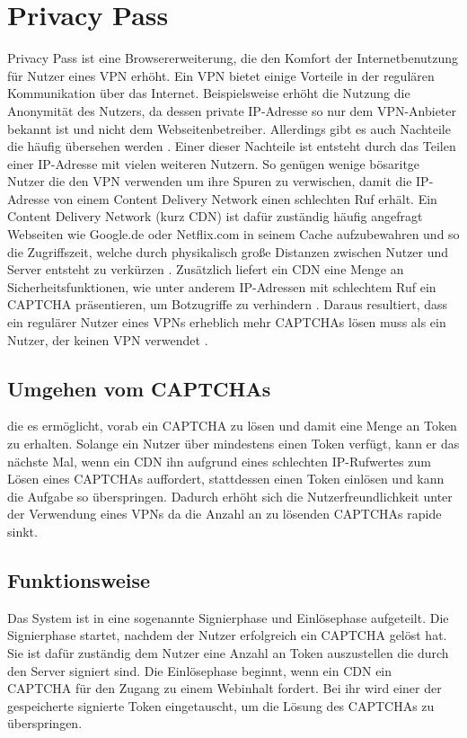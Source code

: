 \documentclass{scrreprt}
\begin{document}
\section{Privacy Pass}
\label{sec:privacy-pass}
Privacy Pass ist eine Browsererweiterung, die den Komfort der Internetbenutzung für Nutzer eines VPN erhöht. Ein VPN bietet einige Vorteile in der regulären Kommunikation über das Internet. Beispielsweise erhöht die Nutzung die Anonymität des Nutzers, da dessen private IP-Adresse so nur dem VPN-Anbieter bekannt ist und nicht dem Webseitenbetreiber. Allerdings gibt es auch Nachteile die häufig übersehen werden \cite{pp-Abbas2023Security}. Einer dieser Nachteile ist entsteht durch das Teilen einer IP-Adresse mit vielen weiteren Nutzern. So genügen wenige bösaritge Nutzer die den VPN verwenden um ihre Spuren zu verwischen, damit die IP-Adresse von einem Content Delivery Network einen schlechten Ruf erhält. Ein Content Delivery Network (kurz CDN) ist dafür zuständig häufig angefragt Webseiten wie Google.de oder Netflix.com in seinem Cache aufzubewahren und so die Zugriffszeit, welche durch physikalisch große Distanzen zwischen Nutzer und Server entsteht zu verkürzen \cite{pp-cdn}. Zusätzlich liefert ein CDN eine Menge an Sicherheitsfunktionen, wie unter anderem IP-Adressen mit schlechtem Ruf ein CAPTCHA präsentieren, um Botzugriffe zu verhindern \cite{pp-Ghaznavi2021Content}. Daraus resultiert, dass ein regulärer Nutzer eines VPNs erheblich mehr CAPTCHAs lösen muss als ein Nutzer, der keinen VPN verwendet \cite{pp-davidson2018privacy}.

\subsection{Umgehen vom CAPTCHAs}
 die es ermöglicht, vorab ein CAPTCHA zu lösen und damit eine Menge an Token zu erhalten. Solange ein Nutzer über mindestens einen Token verfügt, kann er das nächste Mal, wenn ein CDN ihn aufgrund eines schlechten IP-Rufwertes zum Lösen eines CAPTCHAs auffordert, stattdessen einen Token einlösen und kann die Aufgabe so überspringen. Dadurch erhöht sich die Nutzerfreundlichkeit unter der Verwendung eines VPNs da die Anzahl an zu lösenden CAPTCHAs rapide sinkt. \cite{pp-davidson2018privacy}

\subsection{Funktionsweise}
Das System ist in eine sogenannte Signierphase und Einlösephase aufgeteilt. Die Signierphase startet, nachdem der Nutzer erfolgreich ein CAPTCHA gelöst hat. Sie ist dafür zuständig dem Nutzer eine Anzahl an Token auszustellen die durch den Server signiert sind. Die Einlösephase beginnt, wenn ein CDN ein CAPTCHA für den Zugang zu einem Webinhalt fordert. Bei ihr wird einer der gespeicherte signierte Token eingetauscht, um die Lösung des CAPTCHAs zu überspringen. 
\end{document}
